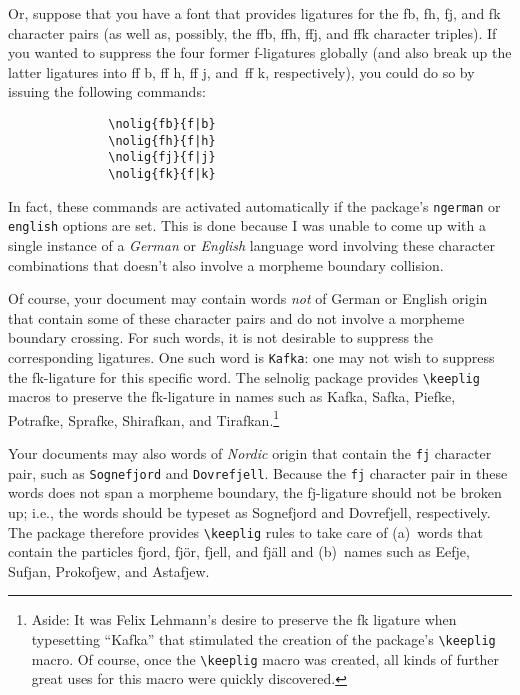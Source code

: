 \documentclass[11pt]{article}
\newcommand{\pkg}[1]{\textsf{#1}}
\newcommand{\opt}[1]{\texttt{#1}}
\newcommand{\cmmd}[1]{\texttt{\textbackslash #1}}
\begin{document}
Or, suppose that you have a font that provides ligatures for the {\ebg \mbox{fb}, \mbox{fh}, \mbox{fj},} and {\ebg\mbox{fk}} character pairs (as well as, possibly, the {\ebg \mbox{ffb}, \mbox{ffh}, \mbox{ffj},} and {\ebg\mbox{ffk}} character triples). If you wanted to suppress the four former f-ligatures globally (and also break up the latter ligatures into ff\kern0pt b, ff\kern0pt h, ff\kern0pt j, and~ff\kern0pt k, respectively), you could do so by issuing the following commands: 
\begin{Verbatim}
              \nolig{fb}{f|b}
              \nolig{fh}{f|h}
              \nolig{fj}{f|j}
              \nolig{fk}{f|k}
\end{Verbatim}
In fact, these commands are activated automatically if the package's \opt{ngerman} or \opt{english} options are set. This is done because I was unable to come up with a single instance of a \emph{German} or \emph{English} language word involving these character combinations that doesn't also involve a morpheme boundary collision.

Of course, your document may contain words \emph{not} of German or English origin that contain some of these character pairs and do not involve a morpheme boundary crossing. For such words, it is not desirable to suppress the corresponding ligatures. One such word is \opt{Kafka}: one may not wish to suppress the {\ebg\mbox{fk}}-ligature for this specific word. The \pkg{selnolig} package provides \cmmd{keeplig} macros to preserve the {\ebg\mbox{fk}}-ligature in names such as {\ebg Kafka, Safka, Piefke, Potrafke, Sprafke, Shirafkan,} and {\ebg Tirafkan}.\footnote{Aside: It was Felix Lehmann's desire to preserve the {\ebg\mbox{fk}} ligature when typesetting \enquote{{\ebg Kafka}} that stimulated the creation of the package's \cmmd{keeplig} macro. Of course, once the \cmmd{keeplig} macro was created, all kinds of further great uses for this macro were quickly discovered.} 

Your documents may also words of \emph{Nordic} origin that contain the \opt{fj} character pair, such as \opt{Sognefjord} and \opt{Dovrefjell}. Because the \opt{fj} character pair in these words does not span a morpheme boundary, the {\ebg\mbox{fj}}-ligature should not be broken up; i.e., the words should be typeset as {\ebg Sognefjord and Dovrefjell}, respectively. The package therefore provides \cmmd{keeplig} rules to take care of (a)~words that contain the particles {\ebg fjord, fjör, fjell, and fjäll} and (b)~names such as {\ebg Eefje, Sufjan, Prokofjew, and Astafjew}.
\end{document}
